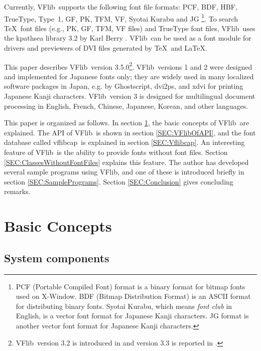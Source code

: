 \documentclass{cah-gut}
\newcommand{\pkg}[1]{\textsf{#1}}
\newcommand{\VFlib}{\pkg{VFlib}}
\newcommand{\vflibcap}{\pkg{vflibcap}}
\begin{document}
Currently, \VFlib\ supports the following font file formats: 
PCF, BDF, HBF, TrueType, Type~1, GF, PK, TFM, VF, Syotai Kurabu 
and JG \footnote{
    PCF (Portable Compiled Font) format is a binary format 
    for bitmap fonts used on X-Window.
    BDF (Bitmap Distribution Format) \cite{BDFSpec} 
    is an ASCII format for distributing binary fonts.
    Syotai Kurabu, which means \textit{font club} in English,
    is a vector font format for Japanese Kanji characters.
    JG format is another vector font format for
    Japanese Kanji characters.
}.  
To search \TeX\ font files (e.g., PK, GF, TFM, VF files)
and TrueType font files, 
\VFlib\ uses the \pkg{kpathsea} library 3.2 by Karl Berry \cite{Kpathsea}.  
\VFlib\ can be used as a font module for
drivers and previewers of DVI files generated by \TeX\ and \LaTeX.

This paper describes \VFlib\ version 3.5.0\footnote{
    \VFlib\ version 3.2 is introduced in \cite{Werner97} and
    version 3.3 is reported in \cite{Kakugawa98a}.
}.  
\VFlib\ versions 1 and 2 were designed and implemented 
for Japanese fonts only; they are widely used
in many localized software packages in Japan, 
e.g. by \pkg{Ghostscript}, \pkg{dvi2ps}, and \pkg{xdvi} 
for printing Japanese Kanji characters.  
\VFlib\ version 3 is designed for multilingual
document processing in English, French, Chinese, Japanese,
Korean, and other languages.

This paper is organized as follows.  In section \ref{SEC:ConceptsOfVFlib}, 
the basic concepts of \VFlib\ are explained.
The API of \VFlib\ is shown in section \ref{SEC:VFlibOfAPI}, and the
font database called \vflibcap\ is explained in section
\ref{SEC:Vflibcap}.  An interesting feature of \VFlib\ is the
ability to provide fonts without font files.  Section
\ref{SEC:ClassesWithoutFontFiles} explains this feature.  The author
has developed several sample programs using \VFlib, and one of these is
introduced briefly in section \ref{SEC:SamplePrograms}.  
Section \ref{SEC:Conclusion} gives concluding remarks.



\section{Basic Concepts}
\label{SEC:ConceptsOfVFlib}

\subsection{System components}
\end{document}
